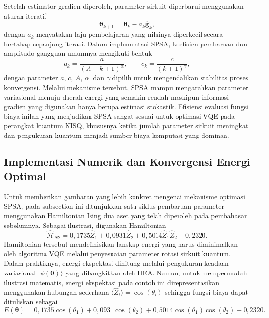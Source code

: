 Setelah estimator gradien diperoleh, parameter sirkuit diperbarui menggunakan aturan iteratif
\begin{equation}
    \boldsymbol{\theta}_{k+1}
    =
    \boldsymbol{\theta}_{k}
    -
    a_k
    \hat{\mathbf{g}}_k,
\end{equation}
dengan $a_k$ menyatakan laju pembelajaran yang nilainya diperkecil secara bertahap sepanjang iterasi. Dalam implementasi SPSA, koefisien pembaruan dan amplitudo gangguan umumnya mengikuti bentuk
\begin{equation}
    a_k
    =
    \frac{a}{(A+k+1)^{\alpha}},
    \qquad
    c_k
    =
    \frac{c}{(k+1)^{\gamma}},
\end{equation}
dengan parameter $a$, $c$, $A$, $\alpha$, dan $\gamma$ dipilih untuk mengendalikan stabilitas proses konvergensi. Melalui mekanisme tersebut, SPSA mampu mengarahkan parameter variasional menuju daerah energi yang semakin rendah meskipun informasi gradien yang digunakan hanya berupa estimasi stokastik. Efisiensi evaluasi fungsi biaya inilah yang menjadikan SPSA sangat sesuai untuk optimasi VQE pada perangkat kuantum NISQ, khususnya ketika jumlah parameter sirkuit meningkat dan pengukuran kuantum menjadi sumber biaya komputasi yang dominan.

\subsection{Implementasi Numerik dan Konvergensi Energi Optimal}
\label{subsec:4_6_2_numerik_fisis}

Untuk memberikan gambaran yang lebih konkret mengenai mekanisme optimasi SPSA, pada subsection ini ditunjukkan satu siklus pembaruan parameter menggunakan Hamiltonian Ising dua aset yang telah diperoleh pada pembahasan sebelumnya. Sebagai ilustrasi, digunakan Hamiltonian
\begin{equation}
    \hat{\mathcal{H}}_{N2}
    =
    0,1735\hat{Z}_1
    +
    0,0931\hat{Z}_2
    +
    0,5014\hat{Z}_1\hat{Z}_2
    +
    0,2320.
\end{equation}
Hamiltonian tersebut mendefinisikan lanskap energi yang harus diminimalkan oleh algoritma VQE melalui penyesuaian parameter rotasi sirkuit kuantum. Dalam praktiknya, energi ekspektasi dihitung melalui pengukuran keadaan variasional $|\psi(\boldsymbol{\theta})\rangle$ yang dibangkitkan oleh HEA. Namun, untuk mempermudah ilustrasi matematis, energi ekspektasi pada contoh ini direpresentasikan menggunakan hubungan sederhana $\langle \hat{Z}_i \rangle = \cos(\theta_i)$ sehingga fungsi biaya dapat dituliskan sebagai
\begin{equation}
    E(\boldsymbol{\theta})
    =
    0,1735\cos(\theta_1)
    +
    0,0931\cos(\theta_2)
    +
    0,5014\cos(\theta_1)\cos(\theta_2)
    +
    0,2320.
\end{equation}

